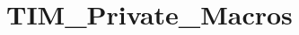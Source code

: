 \hypertarget{group___t_i_m___private___macros}{}\section{T\+I\+M\+\_\+\+Private\+\_\+\+Macros}
\label{group___t_i_m___private___macros}
